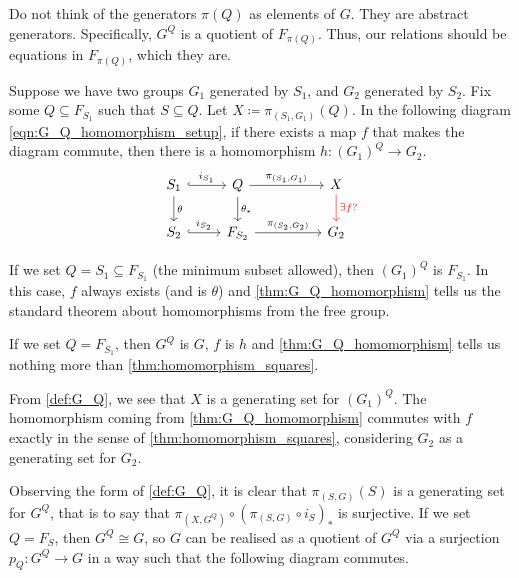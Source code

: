 Do not think of  the generators $\pi(Q)$ as elements of $G$.
They are abstract generators.
Specifically,  $G^Q$ is a quotient of  $F_{\pi(Q)}$.
Thus, our relations should be equations in $F_{\pi(Q)}$, which they are.

\begin{proposition}
	Suppose we have two groups $G_1$ generated by $S_1$, and $G_2$ generated by $S_2$.
	Fix some $Q \subseteq F_{S_1}$ such that  $S \subseteq Q$.
	Let $X \coloneqq \pi_{(S_1, G_1)}(Q) $.
	In the following diagram \eqref{eqn:G_Q_homomorphism_setup}, if there exists a map $f$ that makes the diagram commute, then there is a homomorphism $h \colon (G_1)^Q \to G_2$.
	\begin{equation}
		\begin{tikzcd}
			S_1 \ar[d, "\theta"] \ar[r, hook, "i_{S_1}"] & Q \ar[d, "\theta_*"] \ar[rr, "\pi_{(S_1,G_1)}"] & & X \ar[d, color=red, "\exists f ?"] \\
			S_2 \ar[r, hook, "i_{S_2}"] & F_{S_2} \ar[rr, "\pi_{(S_2,G_2)}"] & & G_2
		\end{tikzcd}
		\label{eqn:G_Q_homomorphism_setup}
	\end{equation}
	\label{thm:G_Q_homomorphism}
\end{proposition}

\begin{remark}
	If we set $Q = S_1 \subseteq F_{S_1}$ (the minimum subset allowed), then  $(G_1)^Q$ is  $F_{S_1}$.
	In this case, $f$ always exists (and is  $\theta$) and \cref{thm:G_Q_homomorphism} tells us the standard theorem about homomorphisms from the free group.
\end{remark}

\begin{remark}
	If we set $Q = F_{S_1}$, then $G^Q$ is  $G$, $f$ is $h$ and \cref{thm:G_Q_homomorphism} tells us nothing more than  \cref{thm:homomorphism_squares}.
\end{remark}

\begin{remark}
	From \cref{def:G_Q}, we see that  $X$ is a generating set for  $(G_1)^Q$.
	The homomorphism coming from \cref{thm:G_Q_homomorphism} commutes with $f$ exactly in the sense of \cref{thm:homomorphism_squares}, considering $G_2$ as a generating set for  $G_2$.
\end{remark}

Observing the form of \cref{def:G_Q}, it is clear that $\pi_{(S,G)}(S)$ is a generating set for $G^Q$, that is to say that $\pi_{(X,G^Q)} \circ \left(\pi_{(S,G)} \circ i_S \right)_*$ is surjective.
If we set $Q=F_S$, then $G^Q \cong G$, so $G$ can be realised as a quotient of $G^Q$ via a surjection $p_Q \colon G^Q \to G$ in a way such that the following diagram commutes.

